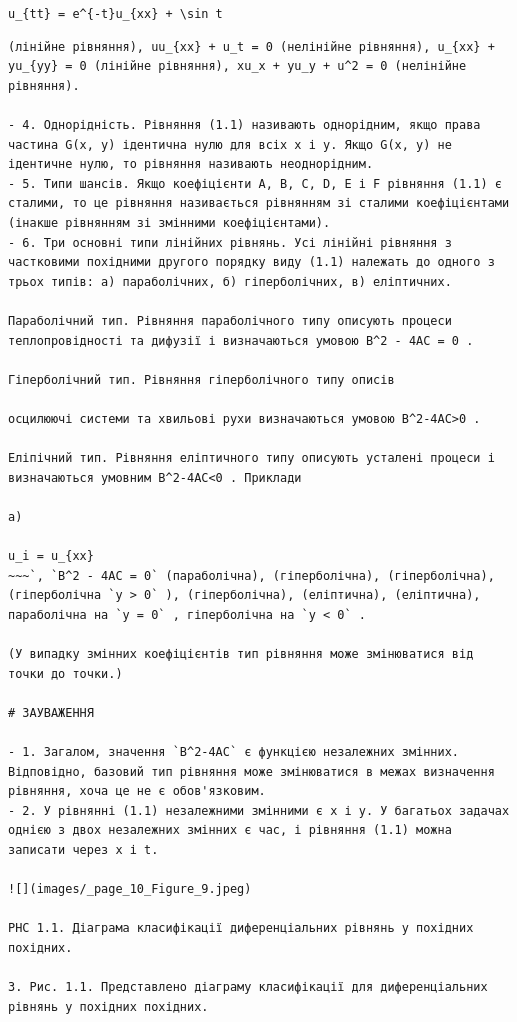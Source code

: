 \documentclass[
  ukrainian,
]{article}
\begin{document}
\texttt{u\_\{tt\}\ =\ e\^{}\{-t\}u\_\{xx\}\ +\ \textbackslash{}sin\ t}

\begin{verbatim}
(лінійне рівняння), uu_{xx} + u_t = 0 (нелінійне рівняння), u_{xx} + yu_{yy} = 0 (лінійне рівняння), xu_x + yu_y + u^2 = 0 (нелінійне рівняння).

- 4. Однорідність. Рівняння (1.1) називають однорідним, якщо права частина G(x, y) ідентична нулю для всіх x і y. Якщо G(x, y) не ідентичне нулю, то рівняння називають неоднорідним.
- 5. Типи шансів. Якщо коефіцієнти A, B, C, D, E і F рівняння (1.1) є сталими, то це рівняння називається рівнянням зі сталими коефіцієнтами (інакше рівнянням зі змінними коефіцієнтами).
- 6. Три основні типи лінійних рівнянь. Усі лінійні рівняння з частковими похідними другого порядку виду (1.1) належать до одного з трьох типів: а) параболічних, б) гіперболічних, в) еліптичних.

Параболічний тип. Рівняння параболічного типу описують процеси теплопровідності та дифузії і визначаються умовою B^2 - 4AC = 0 .

Гіперболічний тип. Рівняння гіперболічного типу описів

осцилюючі системи та хвильові рухи визначаються умовою B^2-4AC>0 .

Еліпічний тип. Рівняння еліптичного типу описують усталені процеси і визначаються умовним B^2-4AC<0 . Приклади

a)

u_i = u_{xx}
~~~`, `B^2 - 4AC = 0` (параболічна), (гіперболічна), (гіперболічна), (гіперболічна `y > 0` ), (гіперболічна), (еліптична), (еліптична), параболічна на `y = 0` , гіперболічна на `y < 0` .

(У випадку змінних коефіцієнтів тип рівняння може змінюватися від точки до точки.)

# ЗАУВАЖЕННЯ

- 1. Загалом, значення `B^2-4AC` є функцією незалежних змінних. Відповідно, базовий тип рівняння може змінюватися в межах визначення рівняння, хоча це не є обов'язковим.
- 2. У рівнянні (1.1) незалежними змінними є x і y. У багатьох задачах однією з двох незалежних змінних є час, і рівняння (1.1) можна записати через x і t.

![](images/_page_10_Figure_9.jpeg)

PHC 1.1. Діаграма класифікації диференціальних рівнянь у похідних похідних.

3. Рис. 1.1. Представлено діаграму класифікації для диференціальних рівнянь у похідних похідних.


\end{verbatim}
\end{document}
